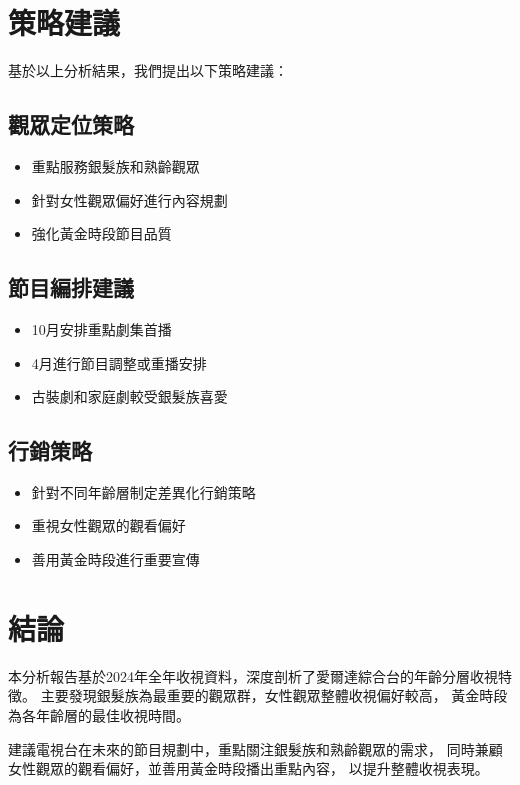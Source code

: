 \documentclass[11pt,a4paper]{article}
\begin{document}
\section{策略建議}

基於以上分析結果，我們提出以下策略建議：

\subsection{觀眾定位策略}
\begin{itemize}
    \item 重點服務銀髮族和熟齡觀眾
    \item 針對女性觀眾偏好進行內容規劃
    \item 強化黃金時段節目品質
\end{itemize}

\subsection{節目編排建議}
\begin{itemize}
    \item 10月安排重點劇集首播
    \item 4月進行節目調整或重播安排
    \item 古裝劇和家庭劇較受銀髮族喜愛
\end{itemize}

\subsection{行銷策略}
\begin{itemize}
    \item 針對不同年齡層制定差異化行銷策略
    \item 重視女性觀眾的觀看偏好
    \item 善用黃金時段進行重要宣傳
\end{itemize}

\section{結論}

本分析報告基於2024年全年收視資料，深度剖析了愛爾達綜合台的年齡分層收視特徵。
主要發現銀髮族為最重要的觀眾群，女性觀眾整體收視偏好較高，
黃金時段為各年齡層的最佳收視時間。

建議電視台在未來的節目規劃中，重點關注銀髮族和熟齡觀眾的需求，
同時兼顧女性觀眾的觀看偏好，並善用黃金時段播出重點內容，
以提升整體收視表現。
\end{document}
